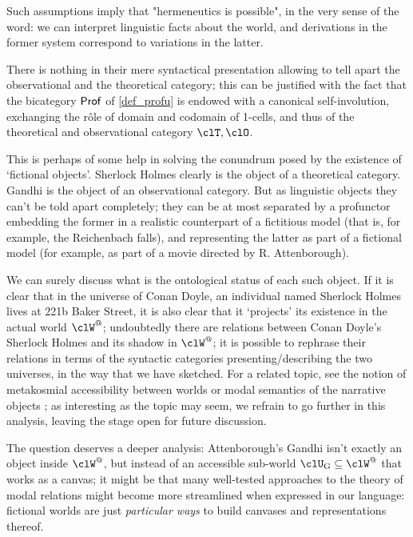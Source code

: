 Such assumptions imply that "hermeneutics is possible", in the very sense of the word: we can interpret linguistic facts about the world, and derivations in the former system correspond to variations in the latter.
\begin{remark}
  There is nothing in their mere syntactical presentation allowing to tell apart the observational and the theoretical category; this can be justified with the fact that the bicategory $\mathsf{Prof}$ of \autoref{def_profu} is endowed with a canonical self-involution, exchanging the r\^ole of domain and codomain of 1-cells, and thus of the theoretical and observational category $\clT,\clO$.

  This is perhaps of some help in solving the conundrum posed by the existence of `fictional objects'. Sherlock Holmes clearly is the object of a theoretical category. Gandhi is the object of an observational category. But as linguistic objects they can't be told apart completely; they can be at most separated by a profunctor embedding the former in a realistic counterpart of a fictitious model (that is, for example, the Reichenbach falls), and representing the latter as part of a fictional model (for example, as part of a movie directed by R. Attenborough).

  We can surely discuss what is the ontological status of each such object. If it is clear that in the universe of Conan Doyle, an individual named Sherlock Holmes lives at 221b Baker Street, it is also clear that it `projects' its existence in the actual world $\clW^@$; undoubtedly there are relations between Conan Doyle's Sherlock Holmes and its shadow in $\clW^@$; it is possible to rephrase their relations in terms of the syntactic categories presenting/describing the two universes, in the way that we have sketched. For a related topic, see the notion of metakosmial accessibility between worlds or modal semantics of the narrative objects \cite{lewis1978truth}; as interesting as the topic may seem, we refrain to go further in this analysis, leaving the stage open for future discussion.

  The question deserves a deeper analysis: Attenborough's Gandhi isn't exactly an object inside $\clW^@$, but instead of an accessible sub-world $\clU_\text{G} \subseteq \clW^@$ that works as a canvas; it might be that many well-tested approaches to the theory of modal relations might become more streamlined when expressed in our language: fictional worlds are just \emph{particular ways} to build canvases and representations thereof.
\end{remark}
